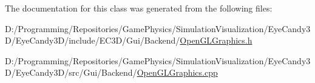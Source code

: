 The documentation for this class was generated from the following files\+:\begin{DoxyCompactItemize}
\item 
D\+:/\+Programming/\+Repositories/\+Game\+Physics/\+Simulation\+Visualization/\+Eye\+Candy3\+D/\+Eye\+Candy3\+D/include/\+E\+C3\+D/\+Gui/\+Backend/\mbox{\hyperlink{_open_g_l_graphics_8h}{Open\+G\+L\+Graphics.\+h}}\item 
D\+:/\+Programming/\+Repositories/\+Game\+Physics/\+Simulation\+Visualization/\+Eye\+Candy3\+D/\+Eye\+Candy3\+D/src/\+Gui/\+Backend/\mbox{\hyperlink{_open_g_l_graphics_8cpp}{Open\+G\+L\+Graphics.\+cpp}}\end{DoxyCompactItemize}

